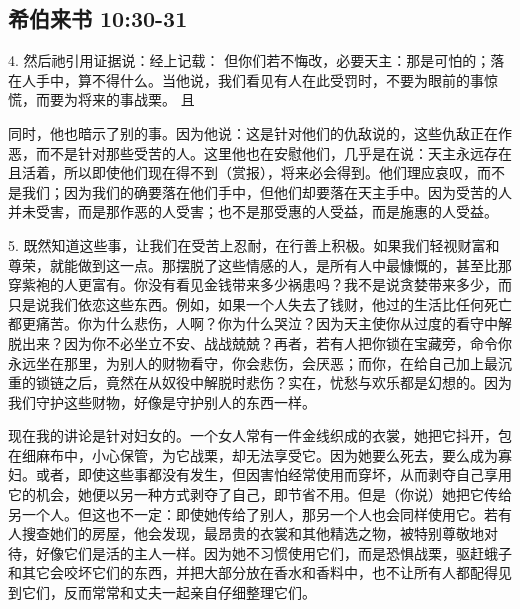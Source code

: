 
\subsection{希伯来书 10:30-31}

4. 然后祂引用证据说：经上记载： 但你们若不悔改，必要天主：那是可怕的；落在人手中，算不得什么。当他说，我们看见有人在此受罚时，不要为眼前的事惊慌，而要为将来的事战栗。 且\par

同时，他也暗示了别的事。因为他说：这是针对他们的仇敌说的，这些仇敌正在作恶，而不是针对那些受苦的人。这里他也在安慰他们，几乎是在说：天主永远存在且活着，所以即使他们现在得不到（赏报），将来必会得到。他们理应哀叹，而不是我们；因为我们的确要落在他们手中，但他们却要落在天主手中。因为受苦的人并未受害，而是那作恶的人受害；也不是那受惠的人受益，而是施惠的人受益。\par

5. 既然知道这些事，让我们在受苦上忍耐，在行善上积极。如果我们轻视财富和尊荣，就能做到这一点。那摆脱了这些情感的人，是所有人中最慷慨的，甚至比那穿紫袍的人更富有。你没有看见金钱带来多少祸患吗？我不是说贪婪带来多少，而只是说我们依恋这些东西。例如，如果一个人失去了钱财，他过的生活比任何死亡都更痛苦。你为什么悲伤，人啊？你为什么哭泣？因为天主使你从过度的看守中解脱出来？因为你不必坐立不安、战战兢兢？再者，若有人把你锁在宝藏旁，命令你永远坐在那里，为别人的财物看守，你会悲伤，会厌恶；而你，在给自己加上最沉重的锁链之后，竟然在从奴役中解脱时悲伤？实在，忧愁与欢乐都是幻想的。因为我们守护这些财物，好像是守护别人的东西一样。\par

现在我的讲论是针对妇女的。一个女人常有一件金线织成的衣裳，她把它抖开，包在细麻布中，小心保管，为它战栗，却无法享受它。因为她要么死去，要么成为寡妇。或者，即使这些事都没有发生，但因害怕经常使用而穿坏，从而剥夺自己享用它的机会，她便以另一种方式剥夺了自己，即节省不用。但是（你说）她把它传给另一个人。但这也不一定：即使她传给了别人，那另一个人也会同样使用它。若有人搜查她们的房屋，他会发现，最昂贵的衣裳和其他精选之物，被特别尊敬地对待，好像它们是活的主人一样。因为她不习惯使用它们，而是恐惧战栗，驱赶蛾子和其它会咬坏它们的东西，并把大部分放在香水和香料中，也不让所有人都配得见到它们，反而常常和丈夫一起亲自仔细整理它们。\par

